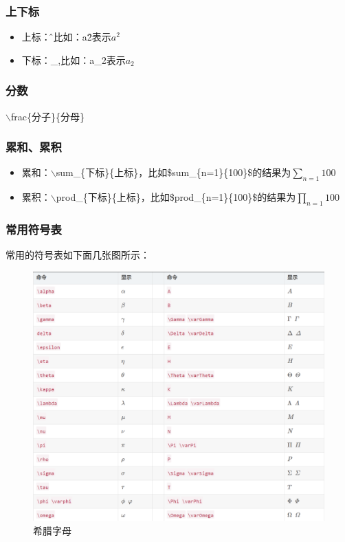 \documentclass{article}
\begin{document}
\subsubsection{上下标}
\begin{itemize}
    \item 上标：\^，比如：a\^2表示$a^2$
    \item 下标：\_,比如：a\_2表示$a_2$
\end{itemize}

\subsubsection{分数}
$\backslash$frac\{分子\}\{分母\}
\subsubsection{累和、累积}
\begin{itemize}
    \item 累和：$\backslash$sum\_\{下标\}\{上标\}，比如\$sum\_\{n=1\}\{100\}\$的结果为$\sum_{n=1}{100}$
    \item 累积：$\backslash$prod\_\{下标\}\{上标\}，比如\$prod\_\{n=1\}\{100\}\$的结果为$\prod_{n=1}{100}$
    
\end{itemize}

\subsubsection{常用符号表}
常用的符号表如下面几张图所示：
 \begin{figure}[H]
\centering
\includegraphics[width=1\textwidth]{希腊字母.png}
\caption{希腊字母}
\label{xila}
\end{figure}
\end{document}

